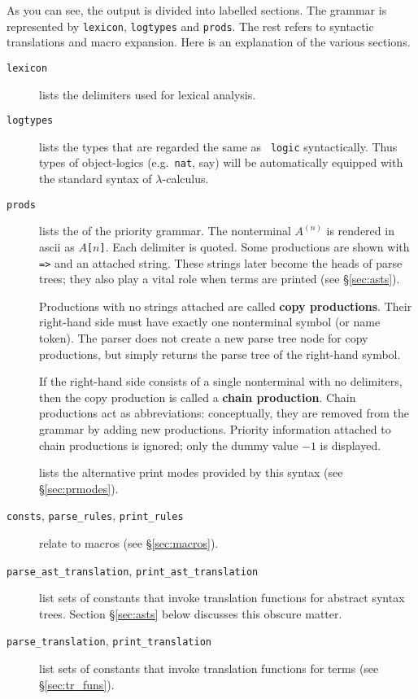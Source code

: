 As you can see, the output is divided into labelled sections.  The grammar
is represented by {\tt lexicon}, {\tt logtypes} and {\tt prods}.  The rest
refers to syntactic translations and macro expansion.  Here is an
explanation of the various sections.
\begin{description}
  \item[{\tt lexicon}] lists the delimiters used for lexical
    analysis.

  \item[{\tt logtypes}] lists the types that are regarded the same as {\tt
    logic} syntactically. Thus types of object-logics (e.g.\ {\tt nat}, say)
    will be automatically equipped with the standard syntax of
    $\lambda$-calculus.

  \item[{\tt prods}] lists the  of the priority grammar.
    The nonterminal $A^{(n)}$ is rendered in {\sc ascii} as {\tt $A$[$n$]}.
    Each delimiter is quoted.  Some productions are shown with {\tt =>} and
    an attached string.  These strings later become the heads of parse
    trees; they also play a vital role when terms are printed (see
    \S\ref{sec:asts}).

    Productions with no strings attached are called {\bf copy
      productions}.  Their right-hand side must
    have exactly one nonterminal symbol (or name token).  The parser does
    not create a new parse tree node for copy productions, but simply
    returns the parse tree of the right-hand symbol.

    If the right-hand side consists of a single nonterminal with no
    delimiters, then the copy production is called a {\bf chain
      production}.  Chain productions act as abbreviations:
    conceptually, they are removed from the grammar by adding new
    productions.  Priority information attached to chain productions is
    ignored; only the dummy value $-1$ is displayed.
    
  \item[] lists the alternative print modes
    provided by this syntax (see \S\ref{sec:prmodes}).

  \item[{\tt consts}, {\tt parse_rules}, {\tt print_rules}]
    relate to macros (see \S\ref{sec:macros}).

  \item[{\tt parse_ast_translation}, {\tt print_ast_translation}]
    list sets of constants that invoke translation functions for abstract
    syntax trees.  Section \S\ref{sec:asts} below discusses this obscure
    matter.

  \item[{\tt parse_translation}, {\tt print_translation}] list sets
    of constants that invoke translation functions for terms (see
    \S\ref{sec:tr_funs}).
\end{description}


